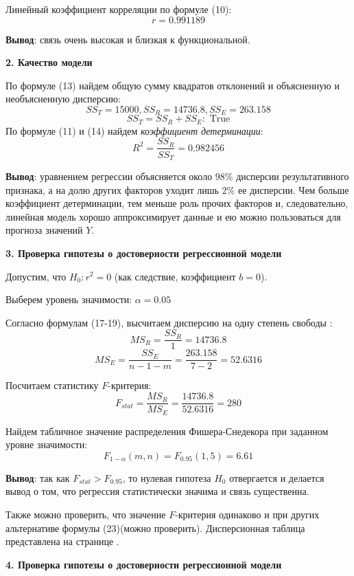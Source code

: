 \documentclass[aps,%
12pt,%
final,%
oneside,
onecolumn,%
musixtex, %
superscriptaddress,%
centertags]{article} %
\begin{document}
Линейный коэффициент корреляции по формуле (10):
$$ r = 0.991189$$

\textbf{Вывод}: связь очень высокая и близкая к функциональной.

\begin{center}
\textbf{2. Качество модели} 
\end{center}

По формуле (13) найдем общую сумму квадратов отклонений и объясненную и необъясненную дисперсию:
$$ SS_T = 15000 , SS_R = 14736.8, SS_E = 263.158$$
$$ SS_T = SS_R + SS_E:  \text{ True}$$ 
По формуле (11) и (14) найдем \textit{коэффициент детерминации}:
$$ R^2 = \frac{SS_R}{SS_T} = 0.982456$$ 

\textbf{Вывод}: уравнением регрессии объясняется около $98\%$ дисперсии результативного признака, а на долю других факторов уходит лишь $2\%$ ее дисперсии. Чем больше коэффициент детерминации, тем меньше роль прочих факторов и, следовательно, линейная модель хорошо аппроксимирует данные и ею можно пользоваться для прогноза значений $Y$.

\begin{center}
\textbf{3. Проверка гипотезы о достоверности регрессионной модели} 
\end{center}

Допустим, что $H_0: r^2 = 0$ (как следствие, коэффициент $b=0$).

Выберем уровень значимости: $\alpha = 0.05$

Согласно формулам (17-19), высчитаем дисперсию на одну степень свободы :
$$ MS_R = \frac{SS_R}{1} = 14736.8 $$
$$ MS_E = \frac{SS_E}{n-1-m} = \frac{263.158}{7-2} = 52.6316 $$

Посчитаем статистику $F$-критерия: $$ F_{stat} = \frac{MS_R}{MS_E} = \frac{14736.8}{52.6316} = 280$$

Найдем табличное значение распределения Фишера-Снедекора при заданном уровне значимости:
$$ F_{1-\alpha}(m,n) = F_{0.95}(1,5) = 6.61$$

\textbf{Вывод}: так как $F_{stat}  > F_{0.95} $, то нулевая гипотеза $H_0$ отвергается и делается вывод о том, что регрессия статистически значима и связь существенна.

Также можно проверить, что значение $F$-критерия одинаково и при других альтернативе формулы (23)(можно проверить). Дисперсионная таблица представлена на странице \pageref{first_table_analiz}.

\begin{center}
\textbf{4. Проверка гипотезы о достоверности регрессионной модели} 
\end{center}
\end{document}
